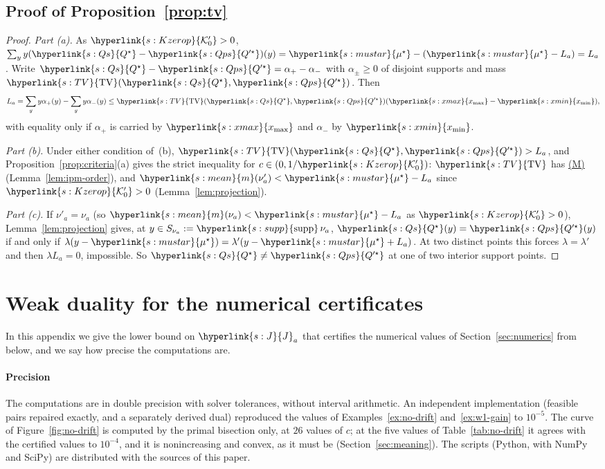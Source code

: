 \documentclass[11pt]{article}
\newcommand{\sy}[2]{{\hyperlink{#1}{#2}}}
\newcommand{\term}[2]{\hyperlink{#1}{#2}}
\newcommand{\xmax}{\sy{s:xmax}{x_{\max}}}
\newcommand{\xmin}{\sy{s:xmin}{x_{\min}}}
\newcommand{\mean}{\sy{s:mean}{m}}
\newcommand{\supp}{\sy{s:supp}{\mathrm{supp}}}
\newcommand{\TV}{\sy{s:TV}{\mathrm{TV}}}
\newcommand{\propM}{\term{s:M}{(M)}}
\newcommand{\mus}{\sy{s:mustar}{\mu^{\star}}}
\newcommand{\Jf}{\sy{s:J}{J}}
\newcommand{\Kop}{\sy{s:Kzerop}{\mathcal{K}'_{0}}}
\newcommand{\Qs}{\sy{s:Qs}{Q^{\star}}}
\newcommand{\Qps}{\sy{s:Qps}{Q'^{\star}}}
\begin{document}
\subsection{Proof of Proposition~\ref{prop:tv}}\label{sec:proof-prop-tv}

\begin{proof}
\emph{Part (a).} As $\Kop>0$, $\sum_yy(\Qs-\Qps)(y)=\mus-(\mus-L_a)=L_a$. Write
$\Qs-\Qps=\alpha_+-\alpha_-$ with $\alpha_\pm\ge0$ of disjoint supports and mass $\TV(\Qs,\Qps)$.
Then
\begin{equation*}
L_a=\sum_yy\alpha_+(y)-\sum_yy\alpha_-(y)\le\TV(\Qs,\Qps)(\xmax-\xmin),
\end{equation*}
with equality only if $\alpha_+$ is carried by $\xmax$ and $\alpha_-$ by $\xmin$.

\emph{Part (b).} Under either condition of~(b), $\TV(\Qs,\Qps)>L_a$, and
Proposition~\ref{prop:criteria}(a) gives the strict inequality for $c\in(0,1/\Kop)$: $\TV$ has \propM{}
(Lemma~\ref{lem:ipm-order}), and $\mean(\nu'_a)<\mus-L_a$ since $\Kop>0$
(Lemma~\ref{lem:projection}).

\emph{Part (c).} If $\nu'_a=\nu_a$ (so $\mean(\nu_a)<\mus-L_a$ as $\Kop>0$),
Lemma~\ref{lem:projection} gives, at $y\in S_{\nu_a}:=\supp\,\nu_a$, $\Qs(y)=\Qps(y)$ if and
only if $\lambda(y-\mus)=\lambda'(y-\mus+L_a)$. At two distinct points this forces
$\lambda=\lambda'$ and then $\lambda L_a=0$, impossible. So $\Qs\ne\Qps$ at one of two interior
support points.
\end{proof}

\section{Weak duality for the numerical certificates}\label{sec:proof-duality}

In this appendix we give the lower bound on $\Jf_a$ that certifies the numerical values of
Section~\ref{sec:numerics} from below, and we say how precise the computations are.

\paragraph{Precision} The computations are in double precision with solver tolerances, without
interval arithmetic. An independent implementation (feasible pairs repaired exactly, and a
separately derived dual) reproduced the values of Examples~\ref{ex:no-drift} and~\ref{ex:w1-gain} to
$10^{-5}$. The curve of Figure~\ref{fig:no-drift} is computed by the primal bisection only, at $26$
values of $c$; at the five values of Table~\ref{tab:no-drift} it agrees with the certified values to
$10^{-4}$, and it is nonincreasing and convex, as it must be (Section~\ref{sec:meaning}). The
scripts (Python, with NumPy and SciPy) are distributed with the sources of this paper.
\end{document}
